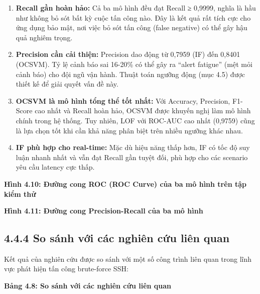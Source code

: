 \documentclass[
  a4paper]{report}
\begin{document}
\begin{enumerate}
\def\labelenumi{\arabic{enumi}.}
\item
  \textbf{Recall gần hoàn hảo:} Cả ba mô hình đều đạt Recall ≥ 0,9999,
  nghĩa là hầu như không bỏ sót bất kỳ cuộc tấn công nào. Đây là kết quả
  rất tích cực cho ứng dụng bảo mật, nơi việc bỏ sót tấn công (false
  negative) có thể gây hậu quả nghiêm trọng.
\item
  \textbf{Precision cần cải thiện:} Precision dao động từ 0,7959 (IF)
  đến 0,8401 (OCSVM). Tỷ lệ cảnh báo sai 16-20\% có thể gây ra ``alert
  fatigue'' (mệt mỏi cảnh báo) cho đội ngũ vận hành. Thuật toán ngưỡng
  động (mục 4.5) được thiết kế để giải quyết vấn đề này.
\item
  \textbf{OCSVM là mô hình tổng thể tốt nhất:} Với Accuracy, Precision,
  F1-Score cao nhất và Recall hoàn hảo, OCSVM được khuyến nghị làm mô
  hình chính trong hệ thống. Tuy nhiên, LOF với ROC-AUC cao nhất
  (0,9759) cũng là lựa chọn tốt khi cần khả năng phân biệt trên nhiều
  ngưỡng khác nhau.
\item
  \textbf{IF phù hợp cho real-time:} Mặc dù hiệu năng thấp hơn, IF có
  tốc độ suy luận nhanh nhất và vẫn đạt Recall gần tuyệt đối, phù hợp
  cho các scenario yêu cầu latency cực thấp.
\end{enumerate}

\textbf{Hình 4.10: Đường cong ROC (ROC Curve) của ba mô hình trên tập
kiểm thử}

\textbf{Hình 4.11: Đường cong Precision-Recall của ba mô hình}

\subsection{4.4.4 So sánh với các nghiên cứu liên
quan}\label{so-suxe1nh-vux1edbi-cuxe1c-nghiuxean-cux1ee9u-liuxean-quan}

Kết quả của nghiên cứu được so sánh với một số công trình liên quan
trong lĩnh vực phát hiện tấn công brute-force SSH:

\textbf{Bảng 4.8: So sánh với các nghiên cứu liên quan}
\end{document}
